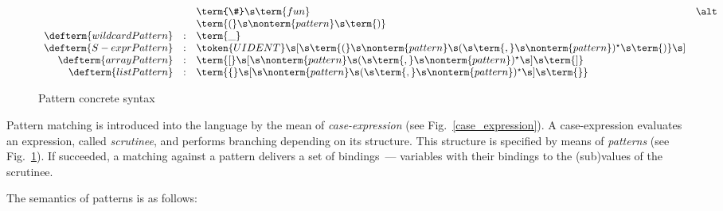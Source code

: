 \begin{figure}[t]
\[\begin{array}{rcll}
                                &   & \term{\#}\s\term{fun} & \alt \\
                                &   & \term{(}\s\nonterm{pattern}\s\term{)} & \\
      \defterm{wildcardPattern} & : & \term{\_} &\\
      \defterm{S-exprPattern}   & : & \token{UIDENT}\s[\s\term{(}\s\nonterm{pattern}\s(\s\term{,}\s\nonterm{pattern})^\star\s\term{)}\s] &\\
      \defterm{arrayPattern}    & : & \term{[}\s[\s\nonterm{pattern}\s(\s\term{,}\s\nonterm{pattern})^\star\s]\s\term{]} &\\
      \defterm{listPattern}     & : & \term{\{}\s[\s\nonterm{pattern}\s(\s\term{,}\s\nonterm{pattern})^\star\s]\s\term{\}} &
    \end{array}
  \]
  \caption{Pattern concrete syntax}
  \label{pattern}
\end{figure}

Pattern matching is introduced into the language by the mean of \emph{case-expression} (see Fig.~\ref{case_expression}). A case-expression
evaluates an expression, called \emph{scrutinee}, and performs branching depending on its structure. This structure is specified by
means of \emph{patterns} (see Fig.~\ref{pattern}). If succeeded, a matching against a pattern delivers a
set of bindings~--- variables with their bindings to the (sub)values of the scrutinee.

The semantics of patterns is as follows:

